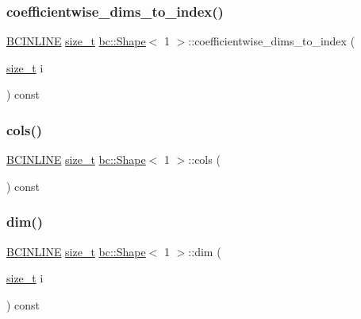 \subsubsection{\texorpdfstring{coefficientwise\+\_\+dims\+\_\+to\+\_\+index()}{coefficientwise\_dims\_to\_index()}}
{\footnotesize\ttfamily \hyperlink{common_8h_a6699e8b0449da5c0fafb878e59c1d4b1}{B\+C\+I\+N\+L\+I\+NE} \hyperlink{structbc_1_1Shape_3_011_01_4_a7ab1c3926651c49d726655dbaa5dc0a3}{size\+\_\+t} \hyperlink{structbc_1_1Shape}{bc\+::\+Shape}$<$ 1 $>$\+::coefficientwise\+\_\+dims\+\_\+to\+\_\+index (\begin{DoxyParamCaption}\item[{\hyperlink{structbc_1_1Shape_3_011_01_4_a7ab1c3926651c49d726655dbaa5dc0a3}{size\+\_\+t}}]{i }\end{DoxyParamCaption}) const\hspace{0.3cm}{\ttfamily [inline]}}

\mbox{\label{structbc_1_1Shape_3_011_01_4_aae101a54c18c8a5decda95aafb5a0856}} 
\subsubsection{\texorpdfstring{cols()}{cols()}}
{\footnotesize\ttfamily \hyperlink{common_8h_a6699e8b0449da5c0fafb878e59c1d4b1}{B\+C\+I\+N\+L\+I\+NE} \hyperlink{structbc_1_1Shape_3_011_01_4_a7ab1c3926651c49d726655dbaa5dc0a3}{size\+\_\+t} \hyperlink{structbc_1_1Shape}{bc\+::\+Shape}$<$ 1 $>$\+::cols (\begin{DoxyParamCaption}{ }\end{DoxyParamCaption}) const\hspace{0.3cm}{\ttfamily [inline]}}

\mbox{\label{structbc_1_1Shape_3_011_01_4_a248d804d61934b5c7ad1f285b624e5a8}} 
\subsubsection{\texorpdfstring{dim()}{dim()}}
{\footnotesize\ttfamily \hyperlink{common_8h_a6699e8b0449da5c0fafb878e59c1d4b1}{B\+C\+I\+N\+L\+I\+NE} \hyperlink{structbc_1_1Shape_3_011_01_4_a7ab1c3926651c49d726655dbaa5dc0a3}{size\+\_\+t} \hyperlink{structbc_1_1Shape}{bc\+::\+Shape}$<$ 1 $>$\+::dim (\begin{DoxyParamCaption}\item[{\hyperlink{structbc_1_1Shape_3_011_01_4_a7ab1c3926651c49d726655dbaa5dc0a3}{size\+\_\+t}}]{i }\end{DoxyParamCaption}) const\hspace{0.3cm}{\ttfamily [inline]}}

